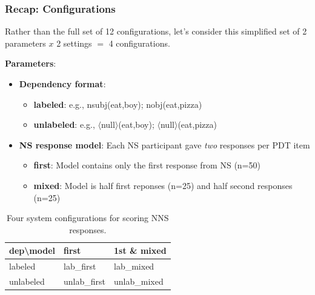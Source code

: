 \documentclass[xcolor={dvipsnames}]{beamer}
\begin{document}
\begin{frame}
\frametitle{Recap: Configurations}
\scriptsize

Rather than the full set of 12 configurations, let's consider this simplified set of 2 parameters $x$ 2 settings $=$ 4 configurations.
\medskip

\textbf{Parameters}:
\scriptsize
\begin{itemize}
\item \textbf{Dependency format}:
\begin{itemize}
\item \textbf{labeled}: e.g., nsubj(eat,boy); nobj(eat,pizza)
\item \textbf{unlabeled}: e.g., $\langle$null$\rangle$(eat,boy); $\langle$null$\rangle$(eat,pizza)
\end{itemize}
\item \textbf{NS response model}:
Each NS participant gave \textit{two} responses per PDT item
\begin{itemize}
\item \textbf{first}: Model contains only the first response from NS (n=50)
\item \textbf{mixed}: Model is half first reponses (n=25) and half second responses (n=25)
\end{itemize}
\end{itemize}
\begin{table}[htb!]
\scriptsize
\begin{center}
\begin{tabular}{|l|l|l|}
\hline
dep\textbackslash model & first & 1st \& mixed \\
\hline
labeled & lab\_first & lab\_mixed \\
\hline
unlabeled & unlab\_first & unlab\_mixed \\
\hline
\end{tabular}
\caption{\scriptsize Four system configurations for scoring NNS responses.}
\end{center}
\end{table}

\end{frame}
\end{document}
